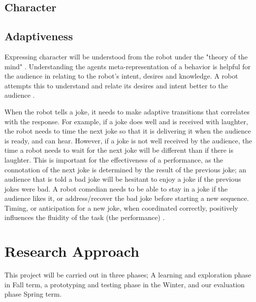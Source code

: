 \documentclass[onecolumn, draftclsnofoot,10pt, compsoc]{IEEEtran}
\begin{document}
\subsection{Character}


\subsection{Adaptiveness}


Expressing character will be understood from the robot under the "theory of the mind" \cite{leslie}. Understanding the agents meta-representation of a behavior is helpful for the audience in relating to the robot's intent, desires and knowledge. A robot attempts this to understand and relate its desires and intent better to the audience \cite{theoryOfMindRobots}.


When the robot tells a joke, it needs to make adaptive transitions that correlates with the response. For example, if a joke does well and is received with laughter, the robot needs to time the next joke so that it is delivering it when the audience is ready, and can hear. However, if a joke is not well received by the audience, the time a robot needs to wait for the next joke will be different than if there is laughter. This is important for the effectiveness of a performance, as the connotation of the next joke is determined by the result of the previous joke; an audience that is told a bad joke will be hesitant to enjoy a joke if the previous jokes were bad. A robot comedian needs to be able to stay in a joke if the audience likes it, or address/recover the bad joke before starting a new sequence. Timing, or anticipation for a new joke, when coordinated correctly, positively influences the fluidity of the task (the performance) \cite{hoffman2010anticipation}.


\section{Research Approach}
This project will be carried out in three phases; A learning and exploration phase in Fall term, a prototyping and testing phase in the Winter, and our evaluation phase Spring term.
\end{document}
